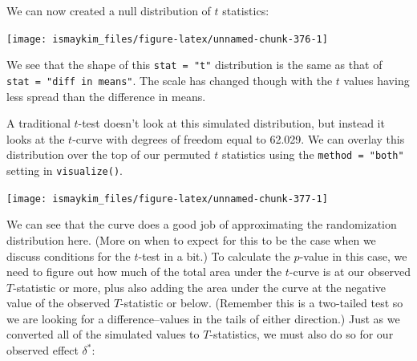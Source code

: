 \documentclass[12pt, krantz2,]{krantz}
\makeatletter
\newenvironment{Shaded}{\begin{snugshade}}{\end{snugshade}}
\newcommand{\DataTypeTok}[1]{\textcolor[rgb]{0.27,0.27,0.27}{#1}}
\newcommand{\KeywordTok}[1]{\textcolor[rgb]{0.27,0.27,0.27}{\textbf{#1}}}
\newcommand{\NormalTok}[1]{#1}
\newcommand{\OperatorTok}[1]{\textcolor[rgb]{0.43,0.43,0.43}{\textbf{#1}}}
\newcommand{\StringTok}[1]{\textcolor[rgb]{0.5,0.5,0.5}{#1}}
\newenvironment{kframe}{%
\medskip{}
\setlength{\fboxsep}{.8em}
 \def\at@end@of@kframe{}%
 \ifinner\ifhmode%
  \def\at@end@of@kframe{\end{minipage}}%
  \begin{minipage}{\columnwidth}%
 \fi\fi%
 \def\FrameCommand##1{\hskip\@totalleftmargin \hskip-\fboxsep
 \colorbox{shadecolor}{##1}\hskip-\fboxsep
     \hskip-\linewidth \hskip-\@totalleftmargin \hskip\columnwidth}%
 \MakeFramed {\advance\hsize-\width
   \@totalleftmargin\z@ \linewidth\hsize
   \@setminipage}}%
 {\par\unskip\endMakeFramed%
 \at@end@of@kframe}
\renewenvironment{Shaded}{\begin{kframe}}{\end{kframe}}
\makeatother
\begin{document}
We can now created a null distribution of \(t\) statistics:

\begin{Shaded}
\end{Shaded}

\begin{center}\texttt{[image: ismaykim\_files/figure-latex/unnamed-chunk-376-1]} \end{center}

We see that the shape of this \texttt{stat\ =\ "t"} distribution is the same as that of \texttt{stat\ =\ "diff\ in\ means"}. The scale has changed though with the \(t\) values having less spread than the difference in means.

A traditional \(t\)-test doesn't look at this simulated distribution, but instead it looks at the \(t\)-curve with degrees of freedom equal to 62.029. We can overlay this distribution over the top of our permuted \(t\) statistics using the \texttt{method\ =\ "both"} setting in \texttt{visualize()}.

\begin{Shaded}
\end{Shaded}

\begin{center}\texttt{[image: ismaykim\_files/figure-latex/unnamed-chunk-377-1]} \end{center}

We can see that the curve does a good job of approximating the randomization distribution here. (More on when to expect for this to be the case when we discuss conditions for the \(t\)-test in a bit.) To calculate the \(p\)-value in this case, we need to figure out how much of the total area under the \(t\)-curve is at our observed \(T\)-statistic or more, plus also adding the area under the curve at the negative value of the observed \(T\)-statistic or below. (Remember this is a two-tailed test so we are looking for a difference--values in the tails of either direction.) Just as we converted all of the simulated values to \(T\)-statistics, we must also do so for our observed effect \(\delta^*\):
\end{document}

